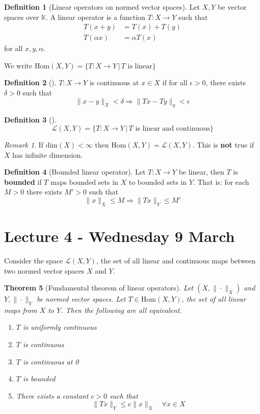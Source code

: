 \documentclass[10pt, oneside, reqno]{amsart}
\theoremstyle{plain}%
\newtheorem{thm}{Theorem}[section]
\theoremstyle{definition}
\newtheorem{defn}[thm]{Definition}
\theoremstyle{remark}
\newtheorem*{rem}{Remark}
\newcommand{\K}{\mathbb{K}}
\begin{document}
\begin{defn}[Linear operators on normed vector spaces]
    Let $X,Y$ be vector spaces over $\K$.  A linear operator is a function $T:X \rightarrow Y$ such that 
    \begin{align*}
        T(x+y) &= T(x) + T(y) \\
        T(\alpha x) &= \alpha T(x)
    \end{align*}
    for all $x,y,\alpha$.

    We write $\text{Hom}(X,Y) = \{ T: X \rightarrow Y \, | \, \text{$T$ is linear} \}$
\end{defn}

\begin{defn}[]
    $T: X \rightarrow Y$ is continuous at $x \in X$ if for all $\epsilon > 0$, there exists $\delta > 0$ such that \[
            \| x - y \|_X < \delta \Rightarrow \| Tx - Ty \|_y < \epsilon 
    \]
\end{defn}

\begin{defn}[]
    \[
    \mathcal{L}(X,Y) = \{ T:  X \rightarrow Y \, | \, \text{$T$ is linear and continuous} \}
    \]
\end{defn}

\begin{rem}
    If $\text{dim}(X) < \infty$ then $\text{Hom}(X,Y) = \mathcal{L}(X,Y)$.  This is \textbf{not} true if $X$ has infinite dimension.
\end{rem}

\begin{defn}[Bounded linear operator]
    Let $T: X \rightarrow Y$ be linear, then $T$ is \textbf{bounded} if $T$ maps bounded sets in $X$ to bounded sets in $Y$.  That is: for each $M > 0$ there exists $M' > 0$ such that \[
        \| x \|_X \leq M \Rightarrow \|Tx\|_Y \leq M'
    \]
\end{defn}

\section{Lecture 4 - Wednesday 9 March } %
\label{sec:lecture_4_}
Consider the space $\mathcal{L}(X, Y)$, the set of all linear and continuous maps between two normed vector spaces $X$ and $Y$.  

\begin{thm}[Fundamental theorem of linear operators]
    Let $( X, \| \cdot \|_X)$ and $Y, \| \cdot \|_Y$ be normed vector spaces.  Let $ T \in \text{Hom}(X,Y)$, the set of all linear maps from $X$ to $Y$.  Then the following are all equivalent.
    \begin{enumerate}[1)]
        \item $T$ is uniformly continuous
        \item $T$ is continuous
        \item $T$ is continuous at 0
        \item $T$ is bounded
        \item There exists a constant $c > 0$ such that \[
            \| Tx \|_Y \leq c \| x \|_X \quad \forall x \in X
        \]
    \end{enumerate}
\end{thm}
\end{document}

